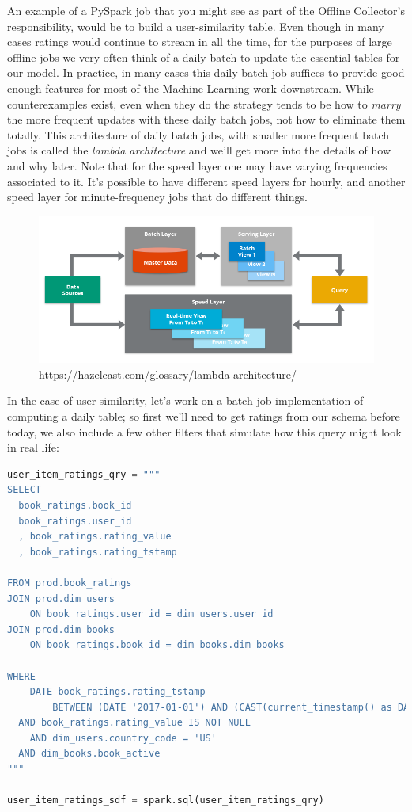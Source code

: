 An example of a PySpark job that you might see as part of the Offline Collector's responsibility, would be to build a user-similarity table. Even though in many cases ratings would continue to stream in all the time, for the purposes of large offline jobs we very often think of a daily batch to update the essential tables for our model. In practice, in many cases this daily batch job suffices to provide good enough features for most of the Machine Learning work downstream. While counterexamples exist, even when they do the strategy tends to be how to \emph{marry} the more frequent updates with these daily batch jobs, not how to eliminate them totally. This architecture of daily batch jobs, with smaller more frequent batch jobs is called the \emph{lambda architecture} and we'll get more into the details of how and why later. Note that for the speed layer one may have varying frequencies associated to it. It's possible to have different speed layers for hourly, and another speed layer for minute-frequency jobs that do different things.

 
\begin{figure}[h!]
    \caption{https://hazelcast.com/glossary/lambda-architecture/}
    \includegraphics[width=\textwidth-10pt]{book-text/spark-architecture.png}
\end{figure}


In the case of user-similarity, let's work on a batch job implementation of computing a daily table; so first we'll need to get ratings from our schema before today, we also include a few other filters that simulate how this query might look in real life:

\begin{lstlisting}[language=Python]
user_item_ratings_qry = """
SELECT 
  book_ratings.book_id
  book_ratings.user_id
  , book_ratings.rating_value
  , book_ratings.rating_tstamp

FROM prod.book_ratings
JOIN prod.dim_users 
	ON book_ratings.user_id = dim_users.user_id 
JOIN prod.dim_books
	ON book_ratings.book_id = dim_books.dim_books

WHERE 
	DATE book_ratings.rating_tstamp 
		BETWEEN (DATE '2017-01-01') AND (CAST(current_timestamp() as DATE)
  AND book_ratings.rating_value IS NOT NULL
	AND dim_users.country_code = 'US'
  AND dim_books.book_active 
"""

user_item_ratings_sdf = spark.sql(user_item_ratings_qry)
\end{lstlisting}

